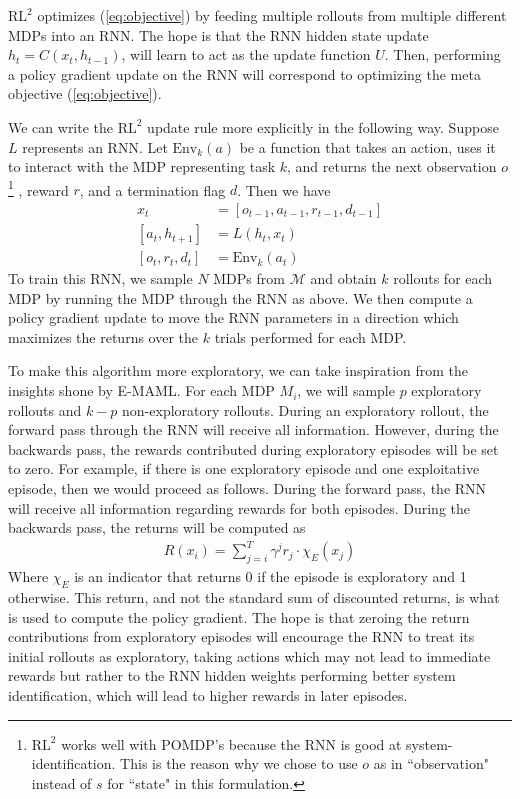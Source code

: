 \documentclass{article} %
\begin{document}
$\text{RL}^2$ optimizes (\ref{eq:objective}) by feeding multiple rollouts from multiple different MDPs into an RNN. The hope is that the RNN hidden state update $h_t = C(x_t, h_{t-1})$, will learn to act as the update function $U$. Then, performing a policy gradient update on the RNN will correspond to optimizing the meta objective (\ref{eq:objective}). 

We can write the $\text{RL}^2$ update rule more explicitly in the following way. Suppose $L$ represents an RNN. Let $\text{Env}_k(a)$ be a function that takes an action, uses it to interact with the MDP representing task $k$, and returns the next observation $o$
\footnote{$\text{RL}^2$ works well with POMDP's because the RNN is good at system-identification. This is the reason why we chose to use $o$ as in ``observation" instead of $s$ for ``state" in this formulation.}
, reward $r$, and a termination flag $d$. Then we have 
\begin{align}
    x_t &= \left[o_{t-1}, a_{t-1}, r_{t-1}, d_{t-1} \right] \\
    \left[ a_t, h_{t+1}\right] &= L(h_t, x_t) \\
    \left[ o_t, r_t, d_t \right] &= \text{Env}_k(a_t)
\end{align}
To train this RNN, we sample $N$ MDPs from $\mathcal{M}$ and obtain $k$ rollouts for each MDP by running the MDP through the RNN as above. We then compute a policy gradient update to move the RNN parameters in a direction which maximizes the returns over the $k$ trials performed for each MDP. 

To make this algorithm more exploratory, we can take inspiration from the insights shone by E-MAML. For each MDP $M_i$, we will sample $p$ exploratory rollouts and $k-p$ non-exploratory rollouts. During an exploratory rollout, the forward pass through the RNN will receive all information. However, during the backwards pass, the rewards contributed during exploratory episodes will be set to zero. For example, if there is one exploratory episode and one exploitative episode, then we would proceed as follows. During the forward pass, the RNN will receive all information regarding rewards for both episodes. During the backwards pass, the returns will be computed as
\begin{align}
    R(x_i) = \sum_{j=i}^{T} \gamma^j r_j \cdot \chi_E(x_j)
\end{align}
Where $\chi_E$ is an indicator that returns 0 if the episode is exploratory and 1 otherwise. This return, and not the standard sum of discounted returns, is what is used to compute the policy gradient. The hope is that zeroing the return contributions from exploratory episodes will encourage the RNN to treat its initial rollouts as exploratory, taking actions which may not lead to immediate rewards but rather to the RNN hidden weights performing better system identification, which will lead to higher rewards in later episodes.     
\end{document}
